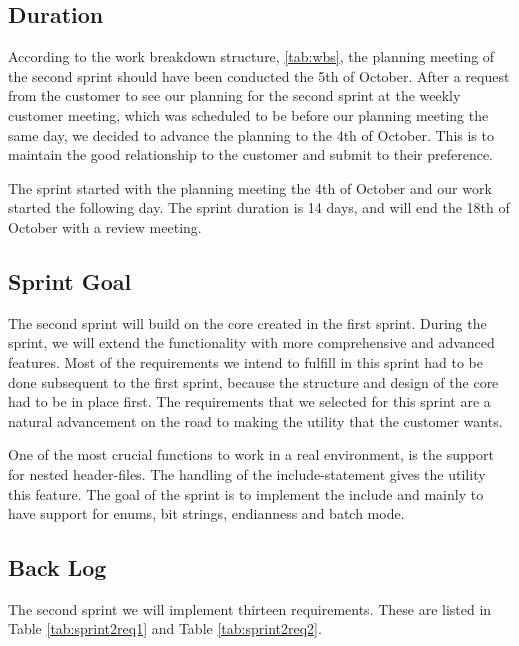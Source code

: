 \subsection{Duration}
According to the work breakdown structure, \autoref{tab:wbs}, the planning meeting of the second sprint should have been conducted the 5th of October. After a request from the customer to see our planning for the second sprint at the weekly customer meeting, which was scheduled to be before our planning meeting the same day, we decided to advance the planning to the 4th of October. This is to maintain the good relationship to the customer and submit to their preference.

The sprint started with the planning meeting the 4th of October and our work started the following day. The sprint duration is 14 days, and will end the 18th of October with a review meeting.  

\subsection{Sprint Goal}
The second sprint will build on the core created in the first sprint. During the sprint, we will extend the functionality with more comprehensive and advanced features. Most of the requirements we intend to fulfill in this sprint had to be done subsequent to the first sprint, because the structure and design of the core had to be in place first. The requirements that we selected for this sprint are a natural advancement on the road to making the \gls{utility} that the customer wants. 

One of the most crucial functions to work in a real environment, is the support for nested \gls{header}-files. The handling of the \gls{include}-statement gives the \gls{utility} this feature. The goal of the sprint is to implement the \gls{include} and mainly to have support for \glspl{enum}, \glspl{bit string}, \gls{endianness} and \gls{batch mode}. 

\subsection{Back Log}
\label{sec:sp2backlog}
The second sprint we will implement thirteen requirements. These are listed in Table
\ref{tab:sprint2req1} and Table \ref{tab:sprint2req2}.


